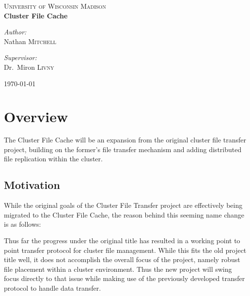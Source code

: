 \documentclass[letterpaper,11pt]{article}
\begin{document}
\begin{titlepage}

\begin{center}

\textsc{\LARGE University of Wisconsin Madison}\\[1.5cm]

{ \huge \bfseries Cluster File Cache}\\[0.4cm]

\begin{minipage}{0.4\textwidth}
\begin{flushleft} \large
\emph{Author:}\\
Nathan \textsc{Mitchell}
\end{flushleft}
\end{minipage}
\begin{minipage}{0.4\textwidth}
\begin{flushright} \large
\emph{Supervisor:} \\
Dr.~Miron \textsc{Livny}
\end{flushright}
\end{minipage}

\vfill

{\large \today}

\end{center}

\end{titlepage}


\section{Overview}

The Cluster File Cache will be an expansion from the original cluster file transfer project, building on the former's file transfer mechanism and adding distributed file replication within the cluster. 

\subsection{Motivation}

While the original goals of the Cluster File Transfer project are effectively being migrated to the Cluster File Cache, the reason behind this seeming name change is as follows:

Thus far the progress under the original title has resulted in a working point to point transfer protocol for cluster file management. While this fits the old project title well, it does not accomplish the overall focus of the project, namely robust file placement within a cluster environment. Thus the new project will swing focus directly to that issue while making use of the previously developed transfer protocol to handle data transfer.
\end{document}
